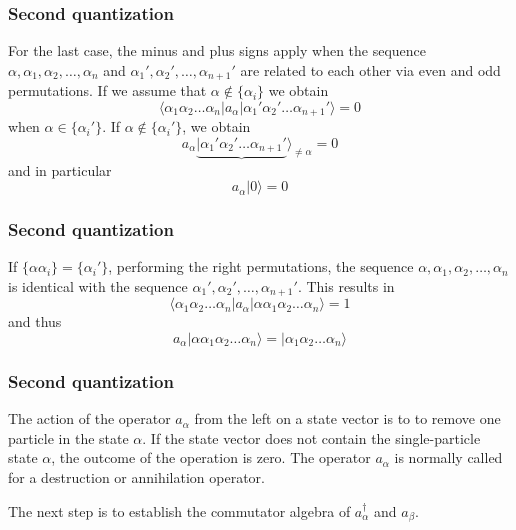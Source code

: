 \documentclass{beamer}
\begin{document}
\begin{frame}
\frametitle{Second quantization}

\begin{block}{}
For the last case, the minus and plus signs apply when the sequence 
$\alpha ,\alpha_1, \alpha_2, \dots, \alpha_n$ and 
$\alpha_1', \alpha_2', \dots, \alpha_{n+1}'$ are related to each other via even and odd permutations.
If we assume that  $\alpha \notin \{\alpha_i\}$ we obtain 
\begin{equation}
	\langle\alpha_1\alpha_2 \dots \alpha_n|a_\alpha|\alpha_1'\alpha_2' \dots \alpha_{n+1}'\rangle = 0 \label{eq:2-12}
\end{equation}
when $\alpha \in \{\alpha_i'\}$. If $\alpha \notin \{\alpha_i'\}$, we obtain
\begin{equation}
	a_\alpha\underbrace{|\alpha_1'\alpha_2' \dots \alpha_{n+1}'}\rangle_{\neq \alpha} = 0 \label{eq:2-13a}
\end{equation}
and in particular
\begin{equation}
	a_\alpha |0\rangle = 0 \label{eq:2-13b}
\end{equation}
\end{block}
\end{frame}

\begin{frame}
\frametitle{Second quantization}

\begin{block}{}
If $\{\alpha\alpha_i\} = \{\alpha_i'\}$, performing the right permutations, the sequence
$\alpha ,\alpha_1, \alpha_2, \dots, \alpha_n$ is identical with the sequence
$\alpha_1', \alpha_2', \dots, \alpha_{n+1}'$. This results in
\begin{equation}
	\langle\alpha_1\alpha_2 \dots \alpha_n|a_\alpha|\alpha\alpha_1\alpha_2 \dots \alpha_{n}\rangle = 1 \label{eq:2-14}
\end{equation}
and thus
\begin{equation}
	a_\alpha |\alpha\alpha_1\alpha_2 \dots \alpha_{n}\rangle = |\alpha_1\alpha_2 \dots \alpha_{n}\rangle \label{eq:2-15}
\end{equation}
\end{block}
\end{frame}

\begin{frame}
\frametitle{Second quantization}

\begin{block}{}
The action of the operator 
$a_\alpha$ from the left on a state vector  is to to remove  one particle in the state
$\alpha$. 
If the state vector does not contain the single-particle state $\alpha$, the outcome of the operation is zero.
The operator  $a_\alpha$ is normally called for a destruction or annihilation operator.

The next step is to establish the  commutator algebra of $a_\alpha^{\dagger}$ and
$a_\beta$. 
\end{block}
\end{frame}
\end{document}
